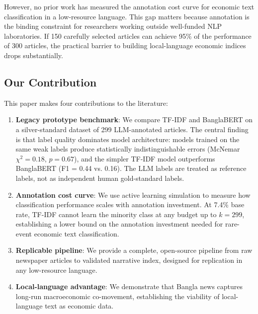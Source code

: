 However, no prior work has measured the annotation cost curve for economic text classification in a low-resource language. This gap matters because annotation is the binding constraint for researchers working outside well-funded NLP laboratories. If 150 carefully selected articles can achieve 95\% of the performance of 300 articles, the practical barrier to building local-language economic indices drops substantially.

\subsection{Our Contribution}

This paper makes four contributions to the literature:

\begin{enumerate}
    \item \textbf{Legacy prototype benchmark}: We compare TF-IDF and BanglaBERT on a silver-standard dataset of 299 LLM-annotated articles. The central finding is that label quality dominates model architecture: models trained on the same weak labels produce statistically indistinguishable errors (McNemar $\chi^2 = 0.18$, $p = 0.67$), and the simpler TF-IDF model outperforms BanglaBERT (F1 = 0.44 vs. 0.16). The LLM labels are treated as reference labels, not as independent human gold-standard labels.
    \item \textbf{Annotation cost curve}: We use active learning simulation to measure how classification performance scales with annotation investment. At 7.4\% base rate, TF-IDF cannot learn the minority class at any budget up to $k = 299$, establishing a lower bound on the annotation investment needed for rare-event economic text classification.
    \item \textbf{Replicable pipeline}: We provide a complete, open-source pipeline from raw newspaper articles to validated narrative index, designed for replication in any low-resource language.
    \item \textbf{Local-language advantage}: We demonstrate that Bangla news captures long-run macroeconomic co-movement, establishing the viability of local-language text as economic data.
\end{enumerate}
